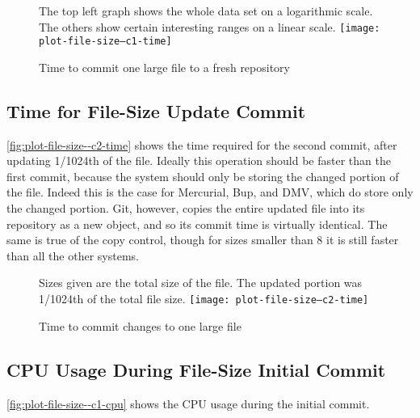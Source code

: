 
\begin{figure}[]
    \caption{Time to commit one large file to a fresh repository}
    \label{fig:plot-file-size--c1-time}
    \centering
    The top left graph shows the whole data set on a logarithmic scale. The
    others show certain interesting ranges on a linear scale.
    \texttt{[image: plot-file-size--c1-time]}
\end{figure}

%


\subsection{Time for File-Size Update Commit}

\autoref{fig:plot-file-size--c2-time} shows the time required for the second
commit, after updating \num{1/1024}th of the file. Ideally this operation should
be faster than the first commit, because the system should only be storing the
changed portion of the file. Indeed this is the case for Mercurial, Bup, and
DMV, which do store only the changed portion. Git, however, copies the entire
updated file into its repository as a new object, and so its commit time is
virtually identical. The same is true of the copy control, though for sizes
smaller than \SI{8}{\gib} it is still faster than all the other systems.


\begin{figure}[]
    \caption{Time to commit changes to one large file}
    \label{fig:plot-file-size--c2-time}
    \centering
    Sizes given are the total size of the file. The updated portion was
    \num{1/1024}th of the total file size.
    \texttt{[image: plot-file-size--c2-time]}
\end{figure}

%


\subsection{CPU Usage During File-Size Initial Commit}

\autoref{fig:plot-file-size--c1-cpu} shows the
CPU usage during the initial commit.


